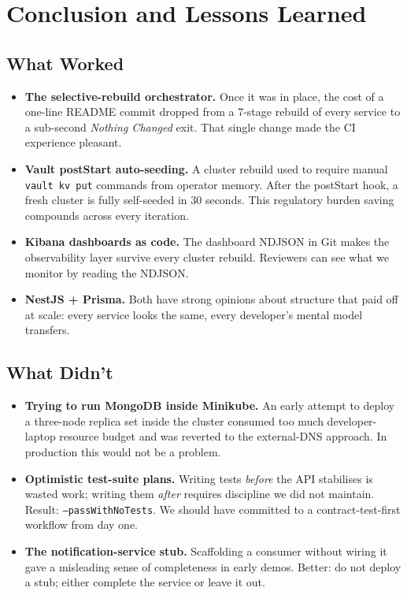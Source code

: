 \documentclass[11pt,a4paper]{article}
\begin{document}
\section{Conclusion and Lessons Learned}

\subsection{What Worked}
\begin{itemize}[leftmargin=*]
  \item \textbf{The selective-rebuild orchestrator.}  Once it was
        in place, the cost of a one-line README commit dropped from
        a 7-stage rebuild of every service to a sub-second
        \emph{Nothing Changed} exit.  That single change made the
        CI experience pleasant.
  \item \textbf{Vault postStart auto-seeding.}  A cluster rebuild
        used to require manual \texttt{vault kv put} commands
        from operator memory.  After the postStart hook, a fresh
        cluster is fully self-seeded in 30 seconds.  This
        regulatory burden saving compounds across every iteration.
  \item \textbf{Kibana dashboards as code.}  The dashboard NDJSON
        in Git makes the observability layer survive every cluster
        rebuild.  Reviewers can see what we monitor by reading the
        NDJSON.
  \item \textbf{NestJS + Prisma.}  Both have strong opinions about
        structure that paid off at scale: every service looks the
        same, every developer's mental model transfers.
\end{itemize}

\subsection{What Didn't}
\begin{itemize}[leftmargin=*]
  \item \textbf{Trying to run MongoDB inside Minikube.}  An early
        attempt to deploy a three-node replica set inside the
        cluster consumed too much developer-laptop resource budget
        and was reverted to the external-DNS approach.  In
        production this would not be a problem.
  \item \textbf{Optimistic test-suite plans.}  Writing tests
        \emph{before} the API stabilises is wasted work; writing
        them \emph{after} requires discipline we did not maintain.
        Result: \texttt{--passWithNoTests}.  We should have
        committed to a contract-test-first workflow from day one.
  \item \textbf{The notification-service stub.}  Scaffolding a
        consumer without wiring it gave a misleading sense of
        completeness in early demos.  Better: do not deploy a
        stub; either complete the service or leave it out.
\end{itemize}
\end{document}
